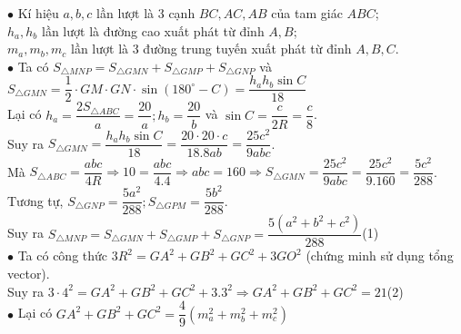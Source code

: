 \begin{ex}
{\begin{center}
\begin{tikzpicture}[scale=1,line width=0.55pt, font={\fontsize{12pt}{0pt}}, line join=round, line cap=round, >=stealth]
			\end{tikzpicture}
		\end{center}
	$\bullet$ Kí hiệu $a, b, c$ lần lượt là 3 cạnh $B C, A C, A B$ của tam giác $A B C$;\\
	$h_a, h_b$ lần lượt là đường cao xuất phát từ đỉnh $A, B$;\\
	$m_a, m_b, m_c$ lần lượt là 3 đường trung tuyến xuất phát từ đỉnh $A, B, C$.\\
	$\bullet$ Ta có $S_{\triangle M N P}=S_{\triangle G M N}+S_{\triangle G M P}+S_{\triangle G N P}$ và $S_{\triangle G M N}=\dfrac{1}{2} \cdot G M \cdot G N \cdot \sin \left(180^{\circ}-C\right)=\dfrac{h_a h_b \sin C}{18}$\\
	Lại có $h_a=\dfrac{2 S_{\triangle A B C}}{a}=\dfrac{20}{a} ; h_b=\dfrac{20}{b}$ và $\sin C=\dfrac{c}{2 R}=\dfrac{c}{8}$.\\
	Suy ra $S_{\triangle G M N}=\dfrac{h_a h_b \sin C}{18}=\dfrac{20 \cdot 20 \cdot c}{18.8 a b}=\dfrac{25 c^2}{9 a b c}$.\\
	Mà $S_{\triangle A B C}=\dfrac{a b c}{4 R} \Rightarrow 10=\dfrac{a b c}{4.4} \Rightarrow a b c=160 \Rightarrow S_{\triangle G M N}=\dfrac{25 c^2}{9 a b c}=\dfrac{25 c^2}{9.160}=\dfrac{5 c^2}{288}$.\\
	Tương tự, $S_{\triangle G N P}=\dfrac{5 a^2}{288} ; S_{\triangle G P M}=\dfrac{5 b^2}{288}$.\\
	Suy ra $S_{\triangle M N P}=S_{\triangle G M N}+S_{\triangle G M P}+S_{\triangle G N P}=\dfrac{5\left(a^2+b^2+c^2\right)}{288}$\quad\quad(1)\\
	$\bullet$ Ta có công thức $3R^2=GA^2+GB^2+GC^2+3GO^2$ (chứng minh sử dụng tổng vector).\\
	Suy ra $3 \cdot 4^2=G A^2+G B^2+G C^2+3.3^2 \Rightarrow G A^2+G B^2+G C^2=21$\quad(2)\\
	$\bullet$ Lại có $G A^2+G B^2+G C^2=\dfrac{4}{9}\left(m_a^2+m_b^2+m_c^2\right)$
	$$
	\begin{aligned}

\end{aligned}$$}
\end{ex}
